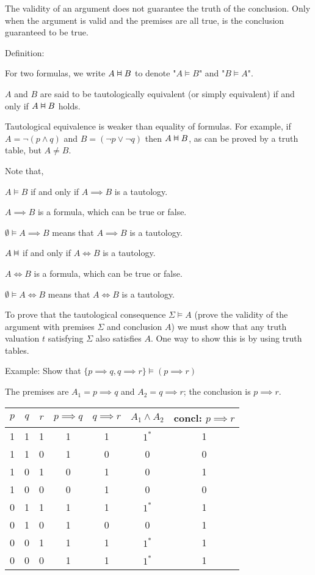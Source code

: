 \documentclass{article}
\newcommand{\vDashv}{%
  \mathrel{%
    \text{%
      \ooalign{$\vDash$\cr\reflectbox{$\vDash$}\cr}%
    }%
  }%
}
\begin{document}
The validity of an argument does not guarantee the truth of the conclusion. Only when the argument is valid and the premises are all true, is the conclusion guaranteed to be true. 

Definition:

For two formulas, we write $A \vDashv B$ to denote "$A \vDash B$" and "$B \vDash A$".

$A$ and $B$ are said to be tautologically equivalent (or simply equivalent) if and only if $A \vDashv B$ holds. 

Tautological equivalence is weaker than equality of formulas. For example, if $A = \neg (p \wedge q)$ and $B = (\neg p \vee \neg q)$ then $A \vDashv B$, as can be proved by a truth table, but $A \neq B$.

Note that,

$A \vDash B$ if and only if $A \implies B$ is a tautology.

$A \implies B$ is a formula, which can be true or false.

$\emptyset \vDash A \implies B$ means that $A \implies B$ is a tautology. 

$A \vDashv$ if and only if $A \iff B$ is a tautology. 

$A \iff B$ is a formula, which can be true or false.

$\emptyset \vDash A \iff B$ means that $A \iff B$ is a tautology. 

To prove that the tautological consequence $\Sigma \vDash A$ (prove the validity of the argument with premises $\Sigma$ and conclusion $A$) we must show that any truth valuation $t$ satisfying $\Sigma$ also satisfies $A$. One way to show this is by using truth tables. 

Example: Show that $\{p \implies q, q \implies r\} \vDash (p \implies r)$

The premises are $A_1 = p \implies q$ and $A_2 = q \implies r$; the conclusion is $p \implies r$. 


\begin{table}[h]
    \centering
    \begin{tabular}{|c|c|c|c|c|c|c|} \hline
         $p$&  $q$&  $r$&  $p \implies q$&  $q \implies r$&  $A_1 \wedge A_2$& concl: $p \implies r$\\ \hline
         1&  1&  1&  1&  1&  $1^*$ & 1\\
         1&  1&  0&  1&  0&  0& 0\\ 
         1&  0&  1&  0&  1&  0& 1\\ 
         1&  0&  0&  0&  1&  0& 0\\ 
         0&  1&  1&  1&  1&  $1^*$& 1\\ 
         0&  1&  0&  1&  0&  0& 1\\ 
         0&  0&  1&  1&  1&  $1^*$& 1\\
         0&  0&  0&  1&  1&  $1^*$& 1\\ \hline
    \end{tabular}
\end{table}
\end{document}

